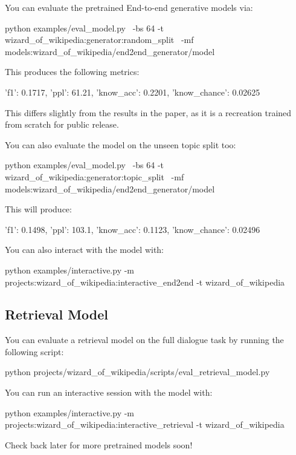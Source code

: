 You can evaluate the pretrained End-\/to-\/end generative models via\+: \begin{DoxyVerb}python examples/eval_model.py \
    -bs 64 -t wizard_of_wikipedia:generator:random_split \
    -mf models:wizard_of_wikipedia/end2end_generator/model
\end{DoxyVerb}


This produces the following metrics\+: \begin{DoxyVerb}{'f1': 0.1717, 'ppl': 61.21, 'know_acc': 0.2201, 'know_chance': 0.02625}
\end{DoxyVerb}


This differs slightly from the results in the paper, as it is a recreation trained from scratch for public release.

You can also evaluate the model on the unseen topic split too\+: \begin{DoxyVerb}python examples/eval_model.py \
    -bs 64 -t wizard_of_wikipedia:generator:topic_split \
    -mf models:wizard_of_wikipedia/end2end_generator/model
\end{DoxyVerb}


This will produce\+: \begin{DoxyVerb}{'f1': 0.1498, 'ppl': 103.1, 'know_acc': 0.1123, 'know_chance': 0.02496}
\end{DoxyVerb}


You can also interact with the model with\+: \begin{DoxyVerb}python examples/interactive.py -m projects:wizard_of_wikipedia:interactive_end2end -t wizard_of_wikipedia
\end{DoxyVerb}


\subsection*{Retrieval Model}

You can evaluate a retrieval model on the full dialogue task by running the following script\+: \begin{DoxyVerb}python projects/wizard_of_wikipedia/scripts/eval_retrieval_model.py
\end{DoxyVerb}


You can run an interactive session with the model with\+: \begin{DoxyVerb}python examples/interactive.py -m projects:wizard_of_wikipedia:interactive_retrieval -t wizard_of_wikipedia
\end{DoxyVerb}


Check back later for more pretrained models soon!

